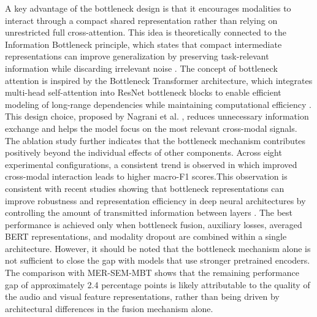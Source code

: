 A key advantage of the bottleneck design is that it encourages modalities to interact through a compact shared representation rather than relying on unrestricted full cross-attention. This idea is theoretically connected to the Information Bottleneck principle, which states that compact intermediate representations can improve generalization by preserving task-relevant information while discarding irrelevant noise \cite{saxe2018information}. The concept of bottleneck attention is inspired by the Bottleneck Transformer architecture, which integrates multi-head self-attention into ResNet bottleneck blocks to enable efficient modeling of long-range dependencies while maintaining computational efficiency \cite{srinivas2021bottleneck}. This design choice, proposed by Nagrani et al. \cite{nagrani2021attention}, reduces unnecessary information exchange and helps the model focus on the most relevant cross-modal signals.
The ablation study further indicates that the bottleneck mechanism contributes positively beyond the individual effects of other components. Across eight experimental configurations, a consistent trend is observed in which improved cross-modal interaction leads to higher macro-F1 scores.This observation is consistent with recent studies showing that bottleneck representations can improve robustness and representation efficiency in deep neural architectures by controlling the amount of transmitted information between layers \cite{kawaguchi2023information}. The best performance is achieved only when bottleneck fusion, auxiliary losses, averaged BERT representations, and modality dropout are combined within a single architecture.
However, it should be noted that the bottleneck mechanism alone is not sufficient to close the gap with models that use stronger pretrained encoders. The comparison with MER-SEM-MBT \cite{xia2022multimodal} shows that the remaining performance gap of approximately 2.4 percentage points is likely attributable to the quality of the audio and visual feature representations, rather than being driven by architectural differences in the fusion mechanism alone.



